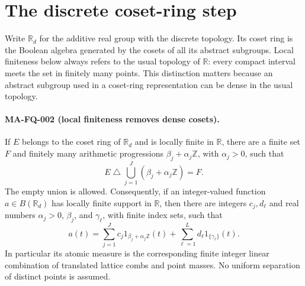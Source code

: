\section{The discrete coset-ring step}
\label{sec:s5-coset}

Write $\mathbb R_d$ for the additive real group with the discrete
topology. Its coset ring is the Boolean algebra generated by the
cosets of all its abstract subgroups. Local finiteness below always
refers to the usual topology of $\mathbb R$: every compact interval
meets the set in finitely many points. This distinction matters
because an abstract subgroup used in a coset-ring representation
can be dense in the usual topology.

\paragraph{MA-FQ-002 (local finiteness removes dense cosets).}
If $E$ belongs to the coset ring of $\mathbb R_d$ and is locally
finite in $\mathbb R$, there are a finite set $F$ and finitely many
arithmetic progressions $\beta_j+\alpha_j\mathbb Z$, with
$\alpha_j>0$, such that
\[
 E\mathbin{\triangle}\bigcup_{j=1}^{J}
                  (\beta_j+\alpha_j\mathbb Z)=F.
 \tag{MA-FQ.2}
\]
The empty union is allowed. Consequently, if an integer-valued
function $a\in B(\mathbb R_d)$ has locally finite support in
$\mathbb R$, then there are integers $c_j,d_\ell$ and real numbers
$\alpha_j>0$, $\beta_j$, and $\gamma_\ell$, with finite index sets,
such that
\[
 a(t)=\sum_{j=1}^{J}c_j
                 1_{\beta_j+\alpha_j\mathbb Z}(t)
       +\sum_{\ell=1}^{L}d_\ell 1_{\{\gamma_\ell\}}(t).
 \tag{MA-FQ.3}
\]
In particular its atomic measure is the corresponding finite
integer linear combination of translated lattice combs and point
masses. No uniform separation of distinct points is assumed.

